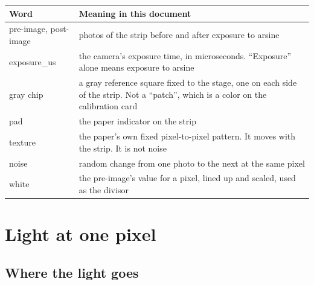 \documentclass[11pt,letter]{article}
\begin{document}
\begin{tabular}{@{}L{3.2cm}L{11.6cm}@{}}
\toprule
Word & Meaning in this document \\
\midrule
pre-image, post-image & photos of the strip before and after exposure to
  arsine \\
exposure\_us & the camera's exposure time, in microseconds.  ``Exposure'' alone
  means exposure to arsine \\
gray chip & a gray reference square fixed to the stage, one on each side
  of the strip.  Not a ``patch'', which is a color on the calibration card \\
pad & the paper indicator on the strip \\
texture & the paper's own fixed pixel-to-pixel pattern.  It moves with the
  strip.  It is not noise \\
noise & random change from one photo to the next at the same pixel \\
white & the pre-image's value for a pixel, lined up and scaled, used as
  the divisor \\
\bottomrule
\end{tabular}

\section{Light at one pixel}
\label{sec:light}

\subsection{Where the light goes}
\end{document}

